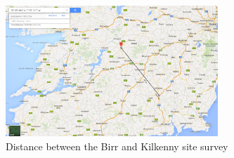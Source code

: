 \documentclass[runningheads,a4paper]{llncs}
\begin{document}
%
\begin{figure}[here]
\centering
\includegraphics[width=8cm]{images/36}
\caption{Distance between the Birr and Kilkenny site survey}
\label{fig:site_survey_birr_kilkenny_distance}
\end{figure}
%


%


%
\end{document}
